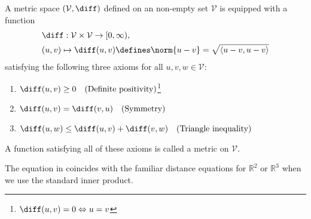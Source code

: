 \begin{definition}\label{def-metric}
	A metric space $(\mathcal{V},\diff)$ defined on an non-empty set $\mathcal{V}$
	is equipped with a function
	\begin{align}
		 & \diff:\mathcal{V}\times\mathcal{V}\to[0,\infty),\nonumber            \\
		 & (u,v)\mapsto\diff(u,v)\defines\norm{u-v}=\sqrt{\left<u-v,u-v\right>}
	\end{align}
	satisfying the following three axioms for all $u,v,w\in\mathcal{V}$:
	\begin{enumerate}
		\item $\diff(u,v)\geq0\quad\text{(Definite positivity)}$\footnote{$\diff(u,v)=0\Leftrightarrow u=v$}
		\item $\diff(u,v)=\diff(v,u)\quad\text{(Symmetry)}$
		\item $\diff(u,w)\leq\diff(u,v)+\diff(v,w)\quad\text{(Triangle inequality)}$
	\end{enumerate}
	A function satisfying all of these axioms is called a metric on $\mathcal{V}$.
\end{definition}

\begin{rem}
	The equation in  coincides with the familiar
	distance equations for $\mathbb{R}^2$ or $\mathbb{R}^3$ when we use the
	standard inner product.
\end{rem}

